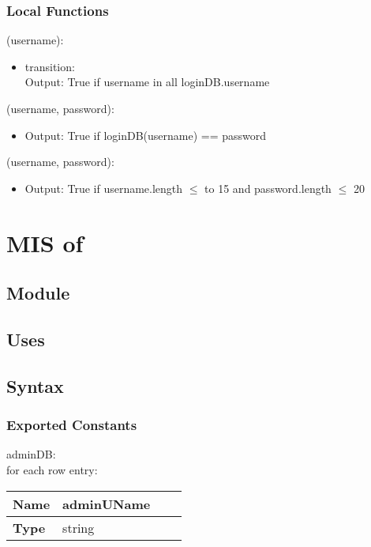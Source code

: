 \documentclass[12pt, titlepage]{article}
\begin{document}
\subsubsection{Local Functions}

\noindent {}(username):
\begin{itemize}
\item transition:\\Output: True if username in all loginDB.username
\end{itemize}

\noindent {}(username, password):
\begin{itemize}
\item Output: True if loginDB(username) == password
\end{itemize}

\noindent {}(username, password):
\begin{itemize}
\item Output: True if username.length $\leq$ to 15 and password.length $\leq$ 20

\end{itemize}

\newpage
\section{MIS of } \label{Module}

\subsection{Module}


\subsection{Uses}


\subsection{Syntax}

\subsubsection{Exported Constants}

adminDB:\\
for each row entry:\\
\begin{center}
\begin{tabular}{p{2cm} p{4cm} p{4cm} p{2cm}}
\hline
\textbf{Name} & adminUName \\
\hline
\textbf{Type} & string \\
\hline
\end{tabular}
\end{center}
\end{document}
